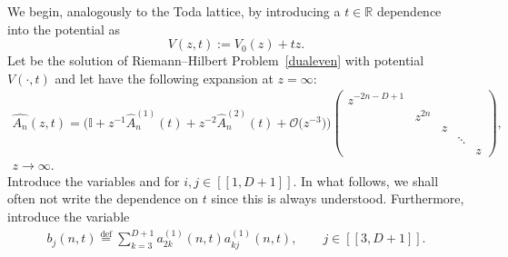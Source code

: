 \documentclass[pdftex]{sigma}
\numberwithin{equation}{section}
\begin{document}
We begin, analogously to the Toda lattice, by introducing a $t \in \mathbb{R}$ dependence into the potential as
\begin{equation}\label{deformation}
 V(z,t) := V_0(z) + tz.
\end{equation}
Let  be the solution of Riemann--Hilbert Problem~\ref{dualeven} with potential $V(\cdot, t)$ and let  have the following expansion at $z= \infty$:
\begin{gather*}
\widehat{A_{n}}(z,t) = \big( \mathbb{I}+ z^{-1} \widehat{A}_{n}^{(1)}(t) + z^{-2} \widehat{A}_{n}^{(2)}(t) + \mathcal{O}\big(z^{-3}\big) \big) \left(\begin{matrix}
z^{-2n-D+1} \\
& z^{2n} \\
& & z \\
& & & \ddots \\
& & & & z
\end{matrix} \right),\\ z \to \infty.
\end{gather*}
Introduce the variables  and  for $i,j \in [\![1, D+1]\!]$. In what follows, we shall often not write the dependence on $t$ since this is always understood. Furthermore, introduce the variable
\begin{align}\label{defb}
b_j(n,t) \overset{\mathrm{def}}{=} \sum_{k=3}^{D+1} a_{2k}^{(1)}(n,t) a_{kj}^{(1)}(n,t),\qquad j \in [\![3, D+1]\!] .
\end{align}
\end{document}
